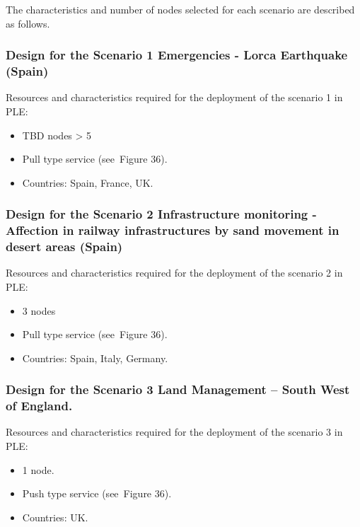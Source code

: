 \documentclass[a4paper]{article}
\newcommand\liststyleLFOxl{%
\renewcommand\labelitemi{[F0B7?]}
\renewcommand\labelitemii{o}
\renewcommand\labelitemiii{[F0A7?]}
\renewcommand\labelitemiv{[F0B7?]}
}
\begin{document}
The characteristics and number of nodes selected for each scenario are
described as follows.

\subsubsection[Design for the Scenario 1 Emergencies {}- Lorca
Earthquake (Spain)]{Design for the Scenario 1 Emergencies - Lorca
Earthquake (Spain)}
\hypertarget{Toc381777246}{}
\bigskip

Resources and characteristics required for the deployment of the
scenario 1 in PLE:\ 

\liststyleLFOxl
\begin{itemize}
\item TBD nodes {\textgreater} 5
\item Pull type service (see\ Figure 36).
\item Countries: Spain, France, UK.\ 
\end{itemize}
\subsubsection[Design for the Scenario 2 Infrastructure monitoring {}-
Affection in railway infrastructures by sand movement in desert areas
(Spain)]{Design for the Scenario 2 Infrastructure monitoring -
Affection in railway infrastructures by sand movement in desert areas
(Spain)}
\hypertarget{Toc381777247}{}
\bigskip

Resources and characteristics required for the deployment of the
scenario 2 in PLE:\ 

\liststyleLFOxl
\begin{itemize}
\item 3 nodes
\item Pull type service (see\ Figure 36).
\item Countries: Spain, Italy, Germany.
\end{itemize}
\subsubsection[Design for the Scenario 3 Land Management {}-- South West
of England.]{Design for the Scenario 3 Land Management -- South West of
England.}
\hypertarget{Toc381777248}{}
\bigskip

Resources and characteristics required for the deployment of the
scenario 3 in PLE:\ 

\liststyleLFOxl
\begin{itemize}
\item 1 node.
\item Push type service (see\ Figure 36).
\item Countries: UK.
\end{itemize}
\end{document}
